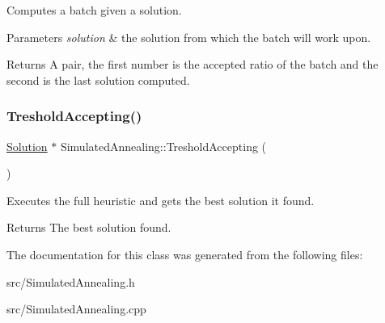 Computes a batch given a solution. 


\begin{DoxyParams}{Parameters}
{\em solution} & the solution from which the batch will work upon. \\
\hline
\end{DoxyParams}
\begin{DoxyReturn}{Returns}
A pair, the first number is the accepted ratio of the batch and the second is the last solution computed. 
\end{DoxyReturn}
\mbox{\label{classSimulatedAnnealing_a863ea18e7ff3f9ba90293a295e44b821}} 
\subsubsection{\texorpdfstring{Treshold\+Accepting()}{TresholdAccepting()}}
{\footnotesize\ttfamily \hyperlink{classSolution}{Solution} $\ast$ Simulated\+Annealing\+::\+Treshold\+Accepting (\begin{DoxyParamCaption}{ }\end{DoxyParamCaption})}



Executes the full heuristic and gets the best solution it found. 

\begin{DoxyReturn}{Returns}
The best solution found. 
\end{DoxyReturn}


The documentation for this class was generated from the following files\+:\begin{DoxyCompactItemize}
\item 
src/Simulated\+Annealing.\+h\item 
src/Simulated\+Annealing.\+cpp\end{DoxyCompactItemize}
